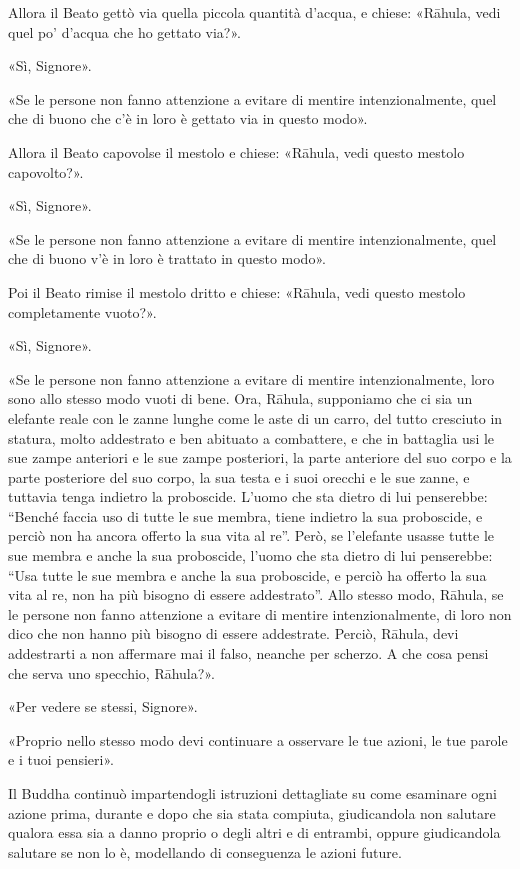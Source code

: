 Allora il Beato gettò via quella piccola quantità d’acqua, e chiese:
«Rāhula, vedi quel po’ d’acqua che ho gettato via?».


«Sì, Signore».


«Se le persone non fanno attenzione a evitare di mentire
intenzionalmente, quel che di buono che c’è in loro è gettato via in
questo modo».


Allora il Beato capovolse il mestolo e chiese: «Rāhula, vedi questo
mestolo capovolto?».


«Sì, Signore».


«Se le persone non fanno attenzione a evitare di mentire
intenzionalmente, quel che di buono v’è in loro è trattato in questo
modo».


Poi il Beato rimise il mestolo dritto e chiese: «Rāhula, vedi questo
mestolo completamente vuoto?».


«Sì, Signore».


«Se le persone non fanno attenzione a evitare di mentire
intenzionalmente, loro sono allo stesso modo vuoti di bene. Ora, Rāhula,
supponiamo che ci sia un elefante reale con le zanne lunghe come le aste
di un carro, del tutto cresciuto in statura, molto addestrato e ben
abituato a combattere, e che in battaglia usi le sue zampe anteriori e
le sue zampe posteriori, la parte anteriore del suo corpo e la parte
posteriore del suo corpo, la sua testa e i suoi orecchi e le sue zanne,
e tuttavia tenga indietro la proboscide. L’uomo che sta dietro di lui
penserebbe: “Benché faccia uso di tutte le sue membra, tiene indietro la
sua proboscide, e perciò non ha ancora offerto la sua vita al re”. Però,
se l’elefante usasse tutte le sue membra e anche la sua proboscide,
l’uomo che sta dietro di lui penserebbe: “Usa tutte le sue membra e
anche la sua proboscide, e perciò ha offerto la sua vita al re, non ha
più bisogno di essere addestrato”. Allo stesso modo, Rāhula, se le
persone non fanno attenzione a evitare di mentire intenzionalmente, di
loro non dico che non hanno più bisogno di essere addestrate. Perciò,
Rāhula, devi addestrarti a non affermare mai il falso, neanche per
scherzo. A che cosa pensi che serva uno specchio, Rāhula?».


«Per vedere se stessi, Signore».


«Proprio nello stesso modo devi continuare a osservare le tue azioni, le
tue parole e i tuoi pensieri».




 Il Buddha continuò impartendogli istruzioni
dettagliate su come esaminare ogni azione prima, durante e dopo che sia
stata compiuta, giudicandola non salutare qualora essa sia a danno
proprio o degli altri e di entrambi, oppure giudicandola salutare se non
lo è, modellando di conseguenza le azioni future.


